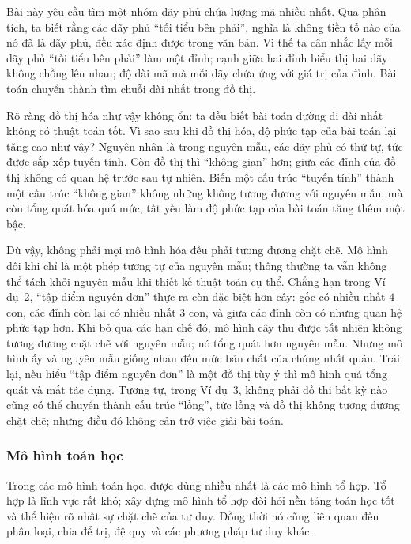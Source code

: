 \documentclass[11pt]{article}
\begin{document}
Bài này yêu cầu tìm một nhóm dãy phủ chứa lượng mã nhiều nhất. Qua phân tích,
ta biết rằng các dãy phủ ``tối tiểu bên phải'', nghĩa là không tiền tố nào của
nó đã là dãy phủ, đều xác định được trong văn bản. Vì thế ta cân nhắc lấy mỗi
dãy phủ ``tối tiểu bên phải'' làm một đỉnh; cạnh giữa hai đỉnh biểu thị hai
dãy không chồng lên nhau; độ dài mã mà mỗi dãy chứa ứng với giá trị của đỉnh.
Bài toán chuyển thành tìm chuỗi dài nhất trong đồ thị.

Rõ ràng đồ thị hóa như vậy không ổn: ta đều biết bài toán đường đi dài nhất
không có thuật toán tốt. Vì sao sau khi đồ thị hóa, độ phức tạp của bài toán
lại tăng cao như vậy? Nguyên nhân là trong nguyên mẫu, các dãy phủ có thứ tự,
tức được sắp xếp tuyến tính. Còn đồ thị thì ``không gian'' hơn; giữa các đỉnh
của đồ thị không có quan hệ trước sau tự nhiên. Biến một cấu trúc ``tuyến
tính'' thành một cấu trúc ``không gian'' không những không tương đương với
nguyên mẫu, mà còn tổng quát hóa quá mức, tất yếu làm độ phức tạp của bài toán
tăng thêm một bậc.

Dù vậy, không phải mọi mô hình hóa đều phải tương đương chặt chẽ. Mô hình đôi
khi chỉ là một phép tương tự của nguyên mẫu; thông thường ta vẫn không thể
tách khỏi nguyên mẫu khi thiết kế thuật toán cụ thể. Chẳng hạn trong
Ví dụ~2, ``tập điểm nguyên đơn'' thực ra còn đặc biệt hơn cây: gốc có nhiều
nhất \(4\) con, các đỉnh còn lại có nhiều nhất \(3\) con, và giữa các đỉnh còn
có những quan hệ phức tạp hơn. Khi bỏ qua các hạn chế đó, mô hình cây thu được
tất nhiên không tương đương chặt chẽ với nguyên mẫu; nó tổng quát hơn nguyên
mẫu. Nhưng mô hình ấy và nguyên mẫu giống nhau đến mức bản chất của chúng nhất
quán. Trái lại, nếu hiểu ``tập điểm nguyên đơn'' là một đồ thị tùy ý thì mô
hình quá tổng quát và mất tác dụng. Tương tự, trong Ví dụ~3, không phải đồ thị
bất kỳ nào cũng có thể chuyển thành cấu trúc ``lồng'', tức lồng và đồ thị
không tương đương chặt chẽ; nhưng điều đó không cản trở việc giải bài toán.

\subsubsection{Mô hình toán học}

Trong các mô hình toán học, được dùng nhiều nhất là các mô hình tổ hợp. Tổ hợp
là lĩnh vực rất khó; xây dựng mô hình tổ hợp đòi hỏi nền tảng toán học tốt và
thể hiện rõ nhất sự chặt chẽ của tư duy. Đồng thời nó cũng liên quan đến phân
loại, chia để trị, đệ quy và các phương pháp tư duy khác.
\end{document}
